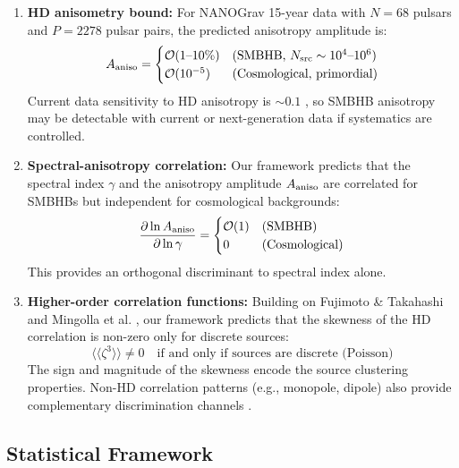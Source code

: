 \documentclass[11pt,a4paper]{article}
\begin{document}
\begin{enumerate}
\item \textbf{HD anisometry bound:} For NANOGrav 15-year data with $N = 68$ pulsars and $P = 2278$ pulsar pairs, the predicted anisotropy amplitude is:
\begin{equation}
A_{\rm aniso} = \begin{cases}
\mathcal{O}(1\text{--}10\%) & \text{(SMBHB, $N_{\rm src} \sim 10^4\text{--}10^6$)}\\
\mathcal{O}(10^{-5}) & \text{(Cosmological, primordial)}
\end{cases}
\end{equation}
Current data sensitivity to HD anisotropy is $\sim 0.1$ \cite{Isi:2024}, so SMBHB anisotropy may be detectable with current or next-generation data if systematics are controlled.

\item \textbf{Spectral-anisotropy correlation:} Our framework predicts that the spectral index $\gamma$ and the anisotropy amplitude $A_{\rm aniso}$ are correlated for SMBHBs but independent for cosmological backgrounds:
\begin{equation}
\frac{\partial \ln A_{\rm aniso}}{\partial \ln \gamma} = \begin{cases}
\mathcal{O}(1) & \text{(SMBHB)}\\
0 & \text{(Cosmological)}
\end{cases}
\end{equation}
This provides an orthogonal discriminant to spectral index alone.

\item \textbf{Higher-order correlation functions:} Building on Fujimoto \& Takahashi \cite{Fujimoto:2026} and Mingolla et al. \cite{Mingolla:2023}, our framework predicts that the skewness of the HD correlation is non-zero only for discrete sources:
\begin{equation}
\langle\langle \zeta^3 \rangle\rangle \neq 0 \quad \text{if and only if sources are discrete (Poisson)}
\end{equation}
The sign and magnitude of the skewness encode the source clustering properties. Non-HD correlation patterns (e.g., monopole, dipole) also provide complementary discrimination channels \cite{Mingolla:2023}.
\end{enumerate}

\subsection{Statistical Framework}\label{sec:statistical}
\end{document}
